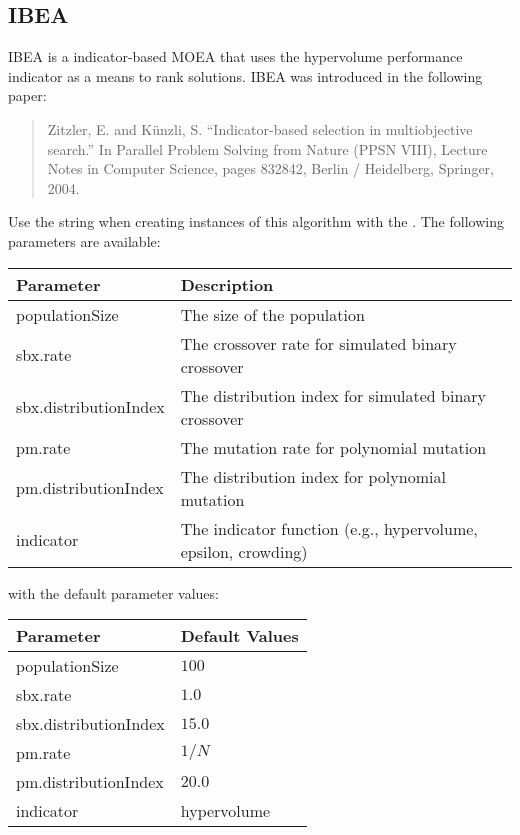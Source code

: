 \subsection{IBEA}
IBEA is a indicator-based MOEA that uses the hypervolume performance indicator as a means to rank solutions.  IBEA was introduced in the following paper:
\begin{quote}
Zitzler, E. and K\"unzli, S.  ``Indicator-based selection in multiobjective search.'' In Parallel Problem Solving from Nature (PPSN VIII), Lecture Notes in Computer Science, pages 832842, Berlin / Heidelberg, Springer, 2004.
\end{quote}
Use the string  when creating instances of this algorithm with the .  The following parameters are available:
\newline
\newline
\begin{tabularx}{\linewidth}{lX}
  \hline
  Parameter & Description \\
  \hline
  populationSize & The size of the population \\
  sbx.rate & The crossover rate for simulated binary crossover \\
  sbx.distributionIndex & The distribution index for simulated binary crossover \\
  pm.rate & The mutation rate for polynomial mutation \\
  pm.distributionIndex & The distribution index for polynomial mutation \\
  indicator & The indicator function (e.g., hypervolume, epsilon, crowding) \\
  \hline
\end{tabularx}
\newline
\newline
with the default parameter values:
\newline
\newline
\begin{tabularx}{\linewidth}{lX}
  \hline
  Parameter & Default Values \\
  \hline
  populationSize & $100$ \\
  sbx.rate & $1.0$ \\
  sbx.distributionIndex & $15.0$ \\
  pm.rate & $1/N$ \\
  pm.distributionIndex & $20.0$ \\
  indicator & hypervolume \\
  \hline
\end{tabularx}


